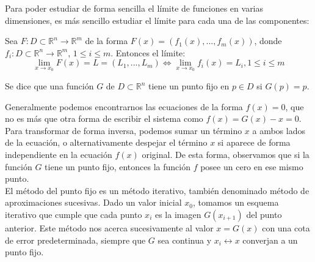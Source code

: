 
Para poder estudiar de forma sencilla el límite de funciones en varias dimensiones, es más sencillo estudiar el límite para cada una de las componentes:

\begin{proposition}
	Sea $F: D \subset \mathbb{R}^n \longrightarrow \mathbb{R}^m$ de la forma $F(x) = (f_1(x),...,f_m(x))$, donde $f_i: D \subset \mathbb{R}^n \longrightarrow \mathbb{R}^m$, $1 \leq i \leq m$. Entonces el límite:
	\[\lim_{x \rightarrow x_0} F(x) = L = (L_1,...,L_m) \iff \lim_{x \rightarrow x_0} f_i(x) = L_i, 1 \leq i \leq m\]
\end{proposition}

	

\begin{definition}
	Se dice que una función $G$ de $D \subset \mathbb{R}^n$ tiene un punto fijo en $p \in D$ si $G(p) = p$.
\end{definition}

Generalmente podemos encontrarnos las ecuaciones de la forma $f(x) = 0$, que no es más que otra forma de escribir el sistema como $f(x) = G(x) - x = 0$. Para transformar de forma inversa, podemos sumar un término $x$ a ambos lados de la ecuación, o alternativamente despejar el término $x$ si aparece de forma independiente en la ecuación $f(x)$ original. De esta forma, observamos que si la función $G$ tiene un punto fijo, entonces la función $f$ posee un cero en ese mismo punto. \\

El método del punto fijo es un método iterativo, también denominado método de aproximaciones sucesivas. Dado un valor inicial $x_0$, tomamos un esquema iterativo que cumple que cada punto $x_i$ es la imagen $G(x_{i+1})$ del punto anterior. Este método nos acerca sucesivamente al valor $x = G(x)$ con una cota de error predeterminada, siempre que $G$ sea continua y $x_i \longleftrightarrow x$ converjan a un punto fijo. \\

